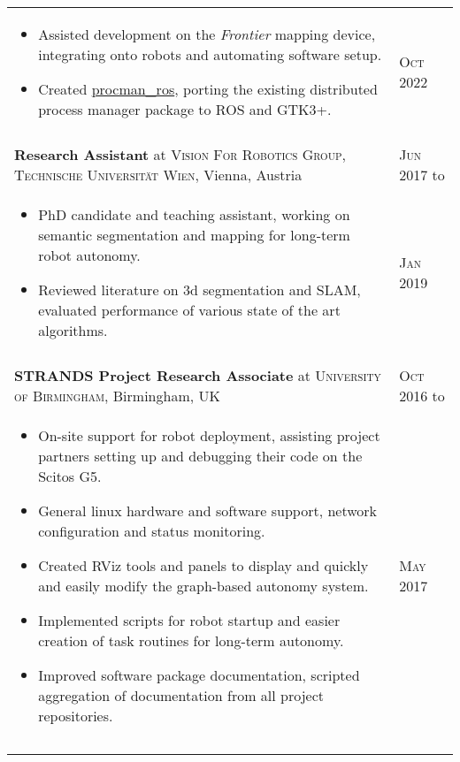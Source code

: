 \documentclass[a4paper,10pt]{article}
\newcommand{\datelen}{1.8cm}
\newcommand{\descrlen}{15.5cm}
\begin{document}
\begin{tabular}{p{\descrlen}|p{\datelen}}
{\begin{itemize}
    \item Assisted development on the \emph{Frontier} mapping device, integrating onto robots and automating software setup.
    \item Created \href{https://github.com/ori-drs/procman_ros}{procman\_ros}, porting the existing distributed process manager package to ROS and GTK3+.
    \vspace{-0.5cm}
  \end{itemize}
  }&\textsc{Oct 2022}\\
  \multicolumn{2}{c}{} \\[-0.2cm]
  \textbf{Research Assistant} at \textsc{Vision For Robotics Group, Technische Universit{\"a}t Wien}, Vienna, Austria& \textsc{Jun 2017} to\\
  \small{
  \vspace{-0.4cm}
  \begin{itemize}
  \item PhD candidate and teaching assistant, working on semantic segmentation and mapping for long-term robot autonomy.
  \item Reviewed literature on 3d segmentation and SLAM, evaluated performance of various state of the art algorithms.
  \vspace{-0.5cm}
  \end{itemize}}&\textsc{Jan 2019}\\
  \multicolumn{2}{c}{} \\[-0.2cm]
  \textbf{STRANDS Project Research Associate} at \textsc{University of Birmingham}, Birmingham, UK & \textsc{Oct 2016} to\\
  \small{
    \vspace{-0.4cm}
  \begin{itemize}
  \item On-site support for robot deployment, assisting project partners setting up and debugging their code on the Scitos G5.
  \item General linux hardware and software support, network configuration and status monitoring.
  \item Created RViz tools and panels to display and quickly and easily modify the graph-based autonomy system.
  \item Implemented scripts for robot startup and easier creation of task routines for long-term autonomy.
  \item Improved software package documentation, scripted aggregation of documentation from all project repositories.
  \vspace{-0.5cm}
  \end{itemize}}&\textsc{May 2017}\\
  \multicolumn{2}{c}{} \\[-0.2cm]
  \begin{comment}
    General work on the STRANDS project codebase, improving the user-facing functionality. Mostly ROS development in Python and C++, along with bash scripting and some linux networking and system administration activities.


\end{comment}
\end{tabular}
\end{document}
